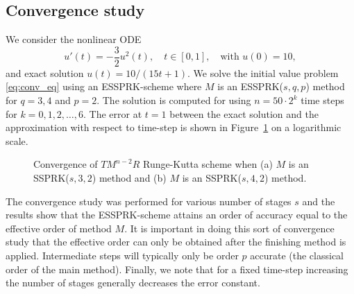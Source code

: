 \subsection{Convergence study}\label{subsec:convergence}
We consider the nonlinear ODE
\begin{equation}\label{eq:conv_eq}
    u'(t) = -\frac{3}{2}u^{2}(t), \quad t \in [0,1], \quad \text{with } u(0) = 10,
\end{equation}
and exact solution $u(t) = 10/(15t + 1)$.
We solve the initial value problem \eqref{eq:conv_eq}
using an ESSPRK-scheme where $M$ is an 
ESSPRK($s,q,p$) method for $q = 3, 4$ and $p = 2$.
The solution is computed for using $n = 50 \cdot 2^{k}$ time steps for
$k = 0, 1, 2, \dots, 6$.
The error at $t=1$ between the exact solution and the approximation with respect 
to time-step is shown in Figure~\ref{fig:conv_study} on a logarithmic scale.
\begin{figure}
	\centering
   \quad
    \caption{Convergence of $TM^{n-2}R$ Runge-Kutta scheme when (a) $M$ 
    is an SSPRK($s,3,2$) method and (b) $ M $ is an SSPRK($s,4,2$) method.}
    \label{fig:conv_study}
\end{figure}
The convergence study was performed for various number of stages $s$ and the results 
show that the ESSPRK-scheme attains an order of accuracy equal to the effective order of 
method $M$.
It is important in doing this sort of convergence study that the
effective order can only be obtained after the finishing method is
applied.
Intermediate steps will typically only be order $p$ accurate (the classical
order of the main method).
Finally, we note that for a fixed time-step increasing the number of stages
generally decreases the error constant.

